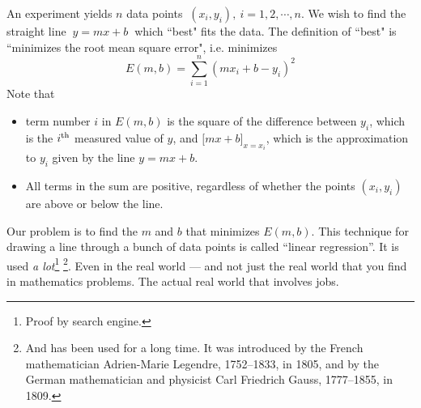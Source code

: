 \begin{eg}\label{eg:MXMNlinReg}
An experiment yields $n$ data points $\ (x_i,y_i),\ i=1,2,\cdots,n.$ 
We wish to find the straight line $\ y=mx+b\ $ which ``best" fits the data.
The definition of ``best" is ``minimizes the root mean square error", 
i.e. minimizes 
\begin{equation*}
E(m,b)=\sum_{i=1}^n (mx_i+b-y_i)^2
\end{equation*}
Note that
\begin{itemize}
\item 
term number $i$ in $E(m,b)$ is the square of the difference between $y_i$,
which is the $i^{\rm th}$ measured value of $y$, and
$\Big[mx+b\Big]_{x=x_i}$, which is the approximation to $y_i$
given by the line $y=mx+b$. 
\item
All terms in the sum are positive, regardless of whether the points
$(x_i,y_i)$ are above or below the line.
\end{itemize}
Our problem is to find the $m$ and $b$ that minimizes $E(m,b)$. 
This technique for drawing a line through a bunch of
data points is called ``linear regression''. It is used 
\emph{a lot}\footnote{Proof by search engine.}
\footnote{And has been used for a long time. It was introduced
by the French mathematician Adrien-Marie Legendre, 1752--1833, in 1805, 
and by the German mathematician and physicist Carl Friedrich Gauss, 
1777--1855, in 1809.}.
Even in the real world --- and not just the real world that you find
in mathematics problems. The actual real world that involves jobs.


\end{eg}
